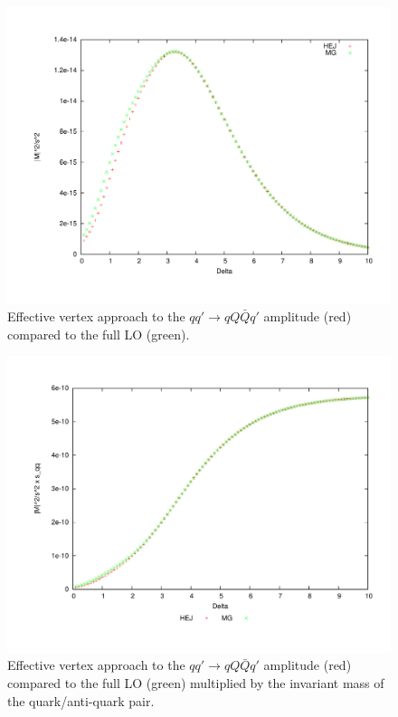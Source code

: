 \begin{figure}[H]
\centering
\includegraphics[scale=0.45]{Images/qQ_qqqxQ.pdf}
\caption{Effective vertex approach to the $qq' \to qQ\bar{Q}q'$ amplitude (red) compared to the full LO (green).}
\label{fig:qq_qqqq}
\end{figure}

\begin{figure}[H]
\centering
\includegraphics[scale=0.45]{Images/qQ_qqqxQ_sqqx.pdf}
\caption{Effective vertex approach to the $qq' \to qQ\bar{Q}q'$ amplitude (red) compared to the full LO (green) multiplied by the invariant mass of the quark/anti-quark pair.}
\label{fig:qq_qqqq_sqq}
\end{figure}

